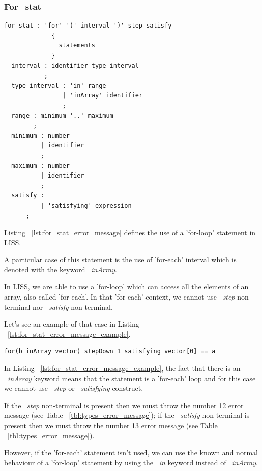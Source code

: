 \documentclass[
  oneside,
  11pt, a4paper,
  footinclude=true,
  headinclude=true,
  cleardoublepage=empty
]{scrbook}
\begin{document}
\subsubsection{For\_stat}

\begin{lstlisting}[caption={For\_stat rule in LISS},label={lst:for_stat_error_message}]
  for_stat : 'for' '(' interval ')' step satisfy
             {
               statements
             }
  interval : identifier type_interval
           ;
  type_interval : 'in' range
                | 'inArray' identifier
                ;
  range : minimum '..' maximum
        ;
  minimum : number
          | identifier
          ;
  maximum : number
          | identifier
          ;
  satisfy :
          | 'satisfying' expression
      ;
\end{lstlisting}

Listing ~\ref{lst:for_stat_error_message} defines the use of a 'for-loop' statement in LISS.

A particular case of this statement is the use of 'for-each' interval which is denoted with the keyword ~\textit{inArray}.

In LISS, we are able to use a 'for-loop' which can access all the elements of an array, also called 'for-each'.
In that 'for-each' context, we cannot use ~\textit{step} non-terminal nor ~\textit{satisfy} non-terminal.

Let's see an example of that case in Listing ~\ref{lst:for_stat_error_message_example}.

\begin{lstlisting}[caption={Example of an error message in for\_stat rule},label={lst:for_stat_error_message_example}]
  for(b inArray vector) stepDown 1 satisfying vector[0] == a
\end{lstlisting}

In Listing ~\ref{lst:for_stat_error_message_example}, the fact that there is an ~\textit{inArray} keyword means that the statement is a 'for-each' loop and for this case we cannot use ~\textit{step} or ~\textit{satisfying} construct.

If the ~\textit{step} non-terminal is present then we must throw the number 12 error message (see Table ~\ref{tbl:types_error_message}); if the ~\textit{satisfy} non-terminal is present then we must throw the number 13 error message (see Table ~\ref{tbl:types_error_message}).

However, if the 'for-each' statement isn't used, we can use the known and normal behaviour of a 'for-loop' statement by using the ~\textit{in} keyword instead of ~\textit{inArray}.
\end{document}

